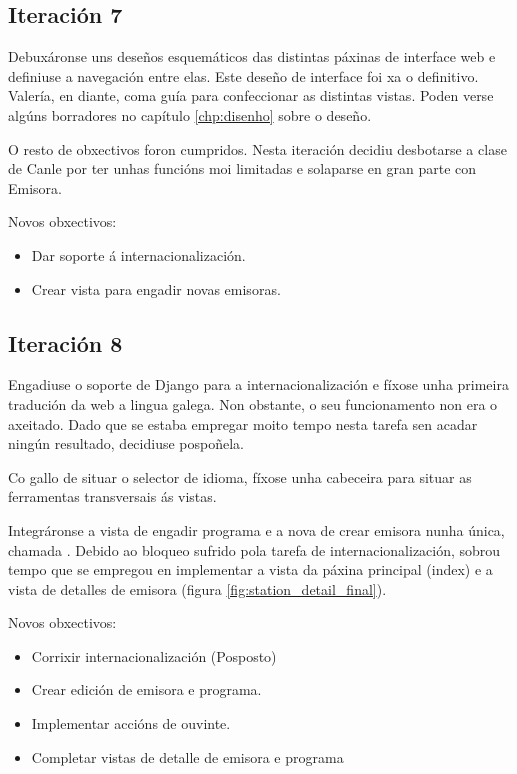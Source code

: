 \subsection{Iteración 7}

Debuxáronse uns deseños esquemáticos das distintas páxinas de interface web e definiuse a navegación entre elas. Este deseño de interface foi xa o definitivo. Valería, en diante, coma guía para confeccionar as distintas vistas. Poden verse algúns borradores no capítulo \ref{chp:disenho} sobre o deseño.

O resto de obxectivos foron cumpridos. Nesta iteración decidiu desbotarse a clase de Canle por ter unhas funcións moi limitadas e solaparse en gran parte con Emisora.

Novos obxectivos:
\begin{itemize}
	\item Dar soporte á internacionalización.
	\item Crear vista para engadir novas emisoras.
\end{itemize}


\subsection{Iteración 8}

Engadiuse o soporte de Django para a internacionalización e fíxose unha primeira tradución da web a lingua galega. Non obstante, o seu funcionamento non era o axeitado. Dado que se estaba empregar moito tempo nesta tarefa sen acadar ningún resultado, decidiuse pospoñela.

Co gallo de situar o selector de idioma, fíxose unha cabeceira para situar as ferramentas transversais ás vistas.

Integráronse a vista de engadir programa e a nova de crear emisora nunha única, chamada . Debido ao bloqueo sufrido pola tarefa de internacionalización, sobrou tempo que se empregou en implementar a vista da páxina principal (index) e a vista de detalles de emisora (figura \ref{fig:station_detail_final}).

Novos obxectivos:
\begin{itemize}
	\item Corrixir internacionalización (Posposto)
	\item Crear edición de emisora e programa.
	\item Implementar accións de ouvinte.
	\item Completar vistas de detalle de emisora e programa
\end{itemize}

